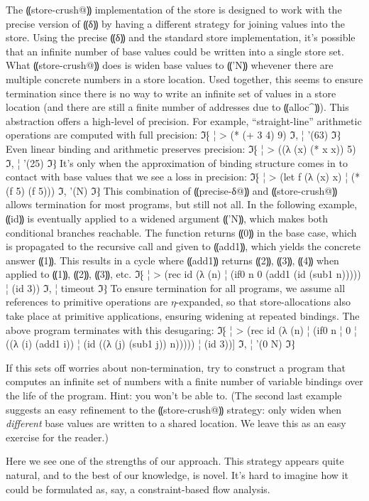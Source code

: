 The ⸨store-crush@⸩ implementation of the store is designed to
work with the precise version of ⸨δ⸩ by having a different
strategy for joining values into the store.  Using the precise
⸨δ⸩ and the standard store implementation, it's possible that
an infinite number of base values could be written into a single store
set.  What ⸨store-crush@⸩ does is widen base values to
⸨'N⸩ whevener there are multiple concrete numbers in a store
location.  Used together, this seems to ensure termination
since there is no way to write an infinite set of values in a
store location (and there are still a finite number of addresses due
to ⸨alloc^⸩).  This abstraction offers a
high-level of precision.  For example, ``straight-line'' arithmetic
operations are computed with full precision:
ℑ⁅
¦ > (* (+ 3 4) 9)
ℑ,
¦ '(63)
ℑ⁆
Even linear binding and arithmetic preserves precision:
ℑ⁅
¦ > ((λ (x) (* x x)) 5)
ℑ,
¦ '(25)
ℑ⁆
It's only when the approximation of binding structure comes in to
contact with base values that we see a loss in precision:
ℑ⁅
¦ > (let f (λ (x) x)
¦     (* (f 5) (f 5)))
ℑ,
'(N)
ℑ⁆
This combination of ⸨precise-δ@⸩ and ⸨store-crush@⸩ allows termination
for most programs, but still not all.
In the following example, ⸨id⸩ is eventually applied to a widened argument ⸨'N⸩,
which makes both conditional branches reachable.
The function returns ⸨0⸩ in the base case,
which is propagated to the recursive call and given to ⸨add1⸩,
which yields the concrete answer ⸨1⸩.
This results in a cycle where ⸨add1⸩ returns ⸨2⸩, ⸨3⸩, ⸨4⸩
when applied to ⸨1⸩, ⸨2⸩, ⸨3⸩, etc.
ℑ⁅
¦ > (rec id (λ (n)
¦             (if0 n 0 (add1 (id (sub1 n)))))
¦     (id 3))
ℑ,
¦ timeout
ℑ⁆
To ensure termination for all programs, we assume all references
to primitive operations are $η$-expanded, so that store-allocations also take place
at primitive applications, ensuring widening at repeated bindings.
The above program terminates with this desugaring:
ℑ⁅
¦ > (rec id (λ (n)
¦             (if0 n
¦                  0
¦                  ((λ (i) (add1 i))
¦                   (id ((λ (j) (sub1 j)) n)))))
¦     (id 3))]
ℑ,
¦ '(0 N)
ℑ⁆


If this sets off worries about non-termination, try to construct a
program that computes an infinite set of numbers with a finite number
of variable bindings over the life of the program.  Hint: you won't be
able to.  (The second last example suggests an easy refinement to the
⸨store-crush@⸩ strategy: only widen when \emph{different} base
values are written to a shared location.  We leave this as an easy
exercise for the reader.)

Here we see one of the strengths of our approach.  This strategy
appears quite natural, and to the best of our knowledge, is novel.
It's hard to imagine how it could be formulated as, say, a
constraint-based flow analysis.
